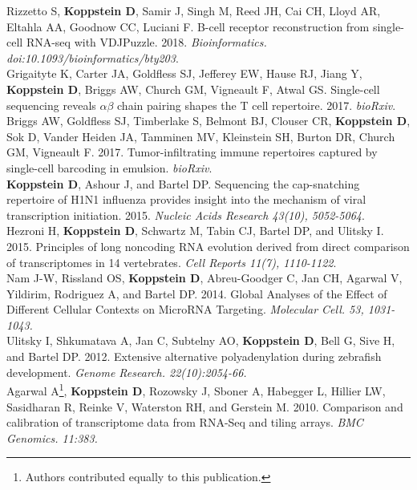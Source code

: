 \documentclass[10pt,a4paper]{article}
\begin{document}
{\noindent Rizzetto S, \textbf{Koppstein D}, Samir J, Singh M, Reed JH, Cai CH, Lloyd AR, Eltahla AA, Goodnow CC, Luciani F. B-cell receptor reconstruction from single-cell RNA-seq with VDJPuzzle. 2018. \textit{Bioinformatics. doi:10.1093/bioinformatics/bty203}. \vspace{0.5em} \\
{\noindent Grigaityte K, Carter JA, Goldfless SJ, Jefferey EW, Hause RJ, Jiang Y, \textbf{Koppstein D}, Briggs AW, Church GM, Vigneault F, Atwal GS. Single-cell sequencing reveals $\alpha \beta$ chain pairing shapes the T cell repertoire. 2017. \textit{bioRxiv}.} \vspace{-0.8em} \\
{\noindent Briggs AW, Goldfless SJ, Timberlake S, Belmont BJ, Clouser CR, \textbf{Koppstein D}, Sok D, Vander Heiden JA, Tamminen MV, Kleinstein SH, Burton DR, Church GM, Vigneault F. 2017. Tumor-infiltrating immune repertoires captured by single-cell barcoding in emulsion. \textit{bioRxiv}. \vspace{0.5em} \\
{\noindent \textbf{Koppstein D}, Ashour J, and Bartel DP. Sequencing the cap-snatching repertoire of H1N1
influenza provides insight into the mechanism of viral transcription initiation. 2015. \textit{Nucleic Acids Research 43(10), 5052-5064}.} \vspace{0.5em} \\
{\noindent Hezroni H, \textbf{Koppstein D}, Schwartz M, Tabin CJ, Bartel DP, and Ulitsky I. 2015. Principles of long noncoding
RNA evolution derived from direct comparison of transcriptomes in 14 vertebrates. \textit{Cell Reports 11(7), 1110-1122}}. \vspace{0.5em} \\
{\noindent Nam J-W, Rissland OS, \textbf{Koppstein D}, Abreu-Goodger C, Jan CH, Agarwal V, Yildirim, Rodriguez A, and Bartel DP. 2014. Global Analyses of the Effect of Different Cellular Contexts on MicroRNA Targeting. \textit{Molecular Cell. 53, 1031-1043.}} \vspace{0.5em} \\
{\noindent Ulitsky I, Shkumatava A, Jan C, Subtelny AO, \textbf{Koppstein D}, Bell G, Sive H, and Bartel DP. 2012. Extensive alternative polyadenylation during zebrafish development. \textit{Genome Research. 22(10):2054-66.}} \vspace{0.5em} \\
{\noindent Agarwal A\footnote[1]{Authors contributed equally to this publication.}, \textbf{Koppstein D}\footnotemark[1], Rozowsky J, Sboner A, Habegger L, Hillier LW, Sasidharan R, Reinke V, Waterston RH, and Gerstein M. 2010. Comparison and calibration of transcriptome data from RNA-Seq and tiling arrays. \textit{BMC Genomics. 11:383.}} \vspace{0.3em} \\
}}
\end{document}
